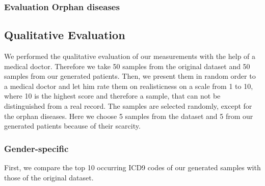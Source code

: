 \documentclass[11pt, a4paper]{book}
\begin{document}
\subsubsection{Evaluation Orphan diseases}


\subsection{Qualitative Evaluation}
We performed the qualitative evaluation of our measurements with the help of a medical doctor. Therefore we take 50 samples from the original dataset and 50 samples from our generated patients. Then, we present them in random order to a medical doctor and let him rate them on realisticness on a scale from 1 to 10, where 10 is the highest score and therefore a sample, that can not be distinguished from a real record.
The samples are selected randomly, except for the orphan diseases. Here we choose 5 samples from the dataset and 5 from our generated patients because of their scarcity.

\subsubsection{Gender-specific}
First, we compare the top 10 occurring ICD9 codes of our generated samples with those of the original dataset.
\end{document}
